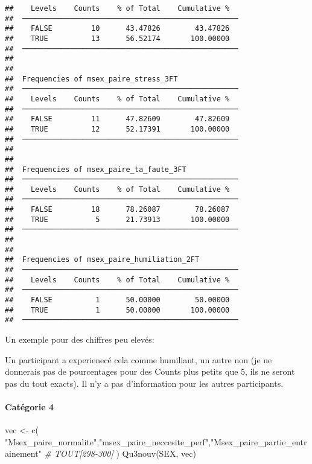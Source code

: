 \documentclass[
]{article}
\newenvironment{Shaded}{\begin{snugshade}}{\end{snugshade}}
\newcommand{\CommentTok}[1]{\textcolor[rgb]{0.56,0.35,0.01}{\textit{#1}}}
\newcommand{\FunctionTok}[1]{\textcolor[rgb]{0.00,0.00,0.00}{#1}}
\newcommand{\NormalTok}[1]{#1}
\newcommand{\OtherTok}[1]{\textcolor[rgb]{0.56,0.35,0.01}{#1}}
\newcommand{\StringTok}[1]{\textcolor[rgb]{0.31,0.60,0.02}{#1}}
\begin{document}
\begin{verbatim}
##    Levels    Counts    % of Total    Cumulative %   
##  ────────────────────────────────────────────────── 
##    FALSE         10      43.47826        43.47826   
##    TRUE          13      56.52174       100.00000   
##  ────────────────────────────────────────────────── 
## 
## 
##  Frequencies of msex_paire_stress_3FT               
##  ────────────────────────────────────────────────── 
##    Levels    Counts    % of Total    Cumulative %   
##  ────────────────────────────────────────────────── 
##    FALSE         11      47.82609        47.82609   
##    TRUE          12      52.17391       100.00000   
##  ────────────────────────────────────────────────── 
## 
## 
##  Frequencies of msex_paire_ta_faute_3FT             
##  ────────────────────────────────────────────────── 
##    Levels    Counts    % of Total    Cumulative %   
##  ────────────────────────────────────────────────── 
##    FALSE         18      78.26087        78.26087   
##    TRUE           5      21.73913       100.00000   
##  ────────────────────────────────────────────────── 
## 
## 
##  Frequencies of msex_paire_humiliation_2FT          
##  ────────────────────────────────────────────────── 
##    Levels    Counts    % of Total    Cumulative %   
##  ────────────────────────────────────────────────── 
##    FALSE          1      50.00000        50.00000   
##    TRUE           1      50.00000       100.00000   
##  ──────────────────────────────────────────────────
\end{verbatim}

Un exemple pour des chiffres peu elevés:

Un participant a experienecé cela comme humiliant, un autre non (je ne
donnerais pas de pourcentages pour des Counts plus petits que 5, ils ne
seront pas du tout exacts). Il n'y a pas d'information pour les autres
participants.

\hypertarget{catuxe9gorie-4-3}{%
\paragraph{Catégorie 4}\label{catuxe9gorie-4-3}}

\begin{Shaded}
\begin{Highlighting}[]
\NormalTok{vec }\OtherTok{\textless{}{-}} \FunctionTok{c}\NormalTok{(  }
  \StringTok{"Msex\_paire\_normalite"}\NormalTok{,}\StringTok{"msex\_paire\_neccesite\_perf"}\NormalTok{,}\StringTok{"Msex\_paire\_partie\_entrainement"}  \CommentTok{\# TOUT[298{-}300]}
\NormalTok{)}
\FunctionTok{Qu3nouv}\NormalTok{(SEX, vec)}
\end{Highlighting}
\end{Shaded}
\end{document}
